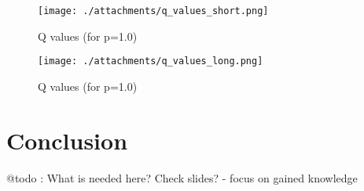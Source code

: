 \documentclass[a4paper,10pt]{article}
\begin{document}
\begin{figure}[!tbp]
  \centering
  \begin{minipage}[b]{0.49\textwidth}
    \texttt{[image: ./attachments/q\_values\_short.png]}
    \caption{Q values (for p=1.0)}
    \label{fig:q-values}
  \end{minipage}
  \hfill
  \begin{minipage}[b]{0.49\textwidth}
    \texttt{[image: ./attachments/q\_values\_long.png]}
    \caption{Q values (for p=1.0)}
    \label{fig:p-values}
  \end{minipage}
\end{figure}

\section{Conclusion}

@todo : What is needed here? Check slides?
- focus on gained knowledge


\end{document}
